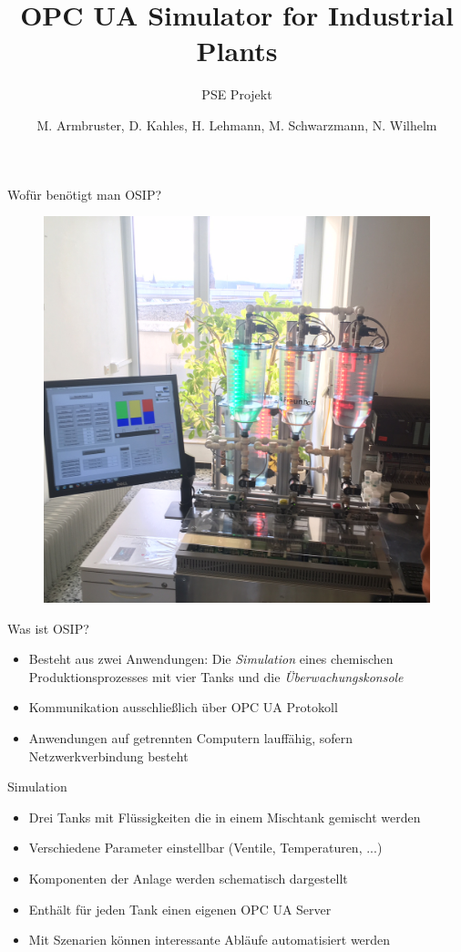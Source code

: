 \documentclass[22pt]{beamer}
\title[OSIP]{OPC UA Simulator for Industrial Plants}
\subtitle{PSE Projekt}
\author{M. Armbruster, D. Kahles, H. Lehmann, M. Schwarzmann, N. Wilhelm}
\begin{document}

\begin{frame}
\titlepage
\end{frame}

\begin{frame}{Wofür benötigt man OSIP?}
\begin{figure}[ht!]
\centering
\includegraphics[height=\textheight,width=\textwidth,keepaspectratio=true]{Demoanlage_IOSB.jpg}
\end{figure}
\end{frame}

\begin{frame}{Was ist OSIP?}
\begin{itemize}[<+->]
 \item Besteht aus zwei Anwendungen: Die \emph{Simulation} eines chemischen Produktionsprozesses mit vier Tanks und die \emph{Überwachungskonsole}
 \item Kommunikation ausschließlich über OPC UA Protokoll
 \item Anwendungen auf getrennten Computern lauffähig, sofern Netzwerkverbindung besteht
\end{itemize}
\end{frame}

\begin{frame}{Simulation}
 \begin{itemize}[<+->]
  \item Drei Tanks mit Flüssigkeiten die in einem Mischtank gemischt werden
  \item Verschiedene Parameter einstellbar (Ventile, Temperaturen, ...)
  \item Komponenten der Anlage werden schematisch dargestellt
  \item Enthält für jeden Tank einen eigenen OPC UA Server
  \item Mit Szenarien können interessante Abläufe automatisiert werden
 \end{itemize}
\end{frame}
\end{document}
